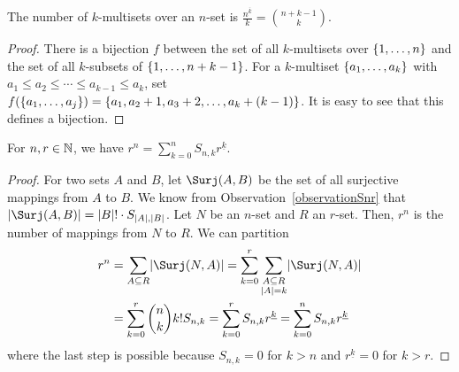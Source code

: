 \documentclass[language=english]{../../Template/TemplateLecture}
\begin{document}
\begin{prop}
    The number of $k$-multisets over an $n$-set is $\frac{n^{\overline{k}}}{k} = \binom{n+k-1}{k}$.
\end{prop}

\begin{proof}
    There is a bijection $f$ between the set of all $k$-multisets over $\{1,\ldots,n\}$ and the set of all $k$-subsets of $\{1,\ldots,n+k-1\}$. For a $k$-multiset $\{a_1, \ldots, a_k\}$ with $a_1 \leq a_2 \leq \cdots \leq a_{k-1} \leq a_k$, set $f(\{a_1,\ldots,a_j\}) = \{a_1,a_2+1, a_3+2, \ldots, a_k + (k-1)\}$. It is easy to see that this defines a bijection.
\end{proof}

\begin{prop}
    For $n, r \in \mathbb{N}$, we have $r^n = \sum_{k = 0}^n S_{n,k} r^{\underline{k}}$.
\end{prop}

\begin{proof}
    For two sets $A$ and $B$, let $\Surj(A,B)$ be the set of all surjective mappings from $A$ to $B$. We know from Observation~\ref{observationSnr} that $\abs{\Surj(A,B)} = \abs{B}! \cdot S_{\abs{A}, \abs{B}}$. Let $N$ be an $n$-set and $R$ an $r$-set. Then, $r^n$ is the number of mappings from $N$ to $R$. We can partition 
    \begin{equation}
        \begin{split}
            r^n &= \sum_{A \subseteq R} \abs{\Surj(N,A)} = \sum_{k = 0}^r \sum_{\substack{A \subseteq R \\ \abs{A} = k}} \abs{\Surj(N,A)} \\
            &= \sum_{k = 0}^r \binom{n}{k} k! S_{n,k} = \sum_{k = 0}^r S_{n,k} r^{\underline{k}} = \sum_{k = 0}^n S_{n,k} r^{\underline{k}}
        \end{split}
    \end{equation}
    where the last step is possible because $S_{n,k} = 0$ for $k > n$ and $r^{\underline{k}} = 0$ for $k > r$.
\end{proof}
\end{document}
